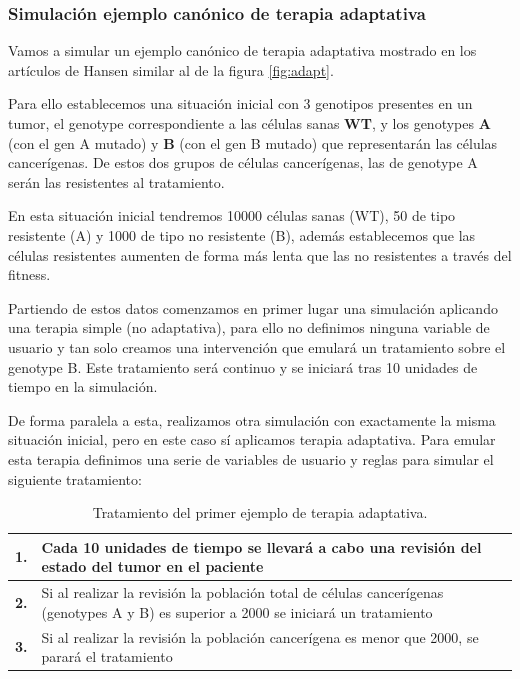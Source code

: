 \subsubsection{Simulación ejemplo canónico de terapia adaptativa}\label{5.3.2.1}

Vamos a simular un ejemplo canónico de terapia adaptativa mostrado en los artículos de Hansen\cite{Hansen1}\cite{Hansen2} similar al de la figura \ref{fig:adapt}.

Para ello establecemos una situación inicial con 3 genotipos presentes en un tumor, el \gls{genotype} correspondiente a las células sanas \textbf{WT}, y los \glspl{genotype} \textbf{A} (con el \gls{gen} A mutado) y \textbf{B} (con el \gls{gen} B mutado) que representarán las células cancerígenas. De estos dos grupos de células cancerígenas, las de \gls{genotype} A serán las resistentes al tratamiento.

En esta situación inicial tendremos 10000 células sanas (WT), 50 de tipo resistente (A) y 1000 de tipo no resistente (B), además establecemos que las células resistentes aumenten de forma más lenta que las no resistentes a través del fitness.

Partiendo de estos datos comenzamos en primer lugar una simulación aplicando una terapia simple (no adaptativa), para ello no definimos ninguna variable de usuario y tan solo creamos una intervención que emulará un tratamiento sobre el \gls{genotype} B. Este tratamiento será continuo y se iniciará tras 10 unidades de tiempo en la simulación.

De forma paralela a esta, realizamos otra simulación con exactamente la misma situación inicial, pero en este caso sí aplicamos terapia adaptativa. Para emular esta terapia definimos una serie de variables de usuario y reglas para simular el siguiente tratamiento:

\begin{table}[h]
	\footnotesize
	\begin{tabular}{|p{0.3cm}|p{15.2cm}|}
		\hline
		\textbf{1.} & Cada 10 unidades de tiempo se llevará a cabo una revisión del estado del tumor en el paciente \\ \hline
		\textbf{2.} & Si al realizar la revisión la población total de células cancerígenas (\glspl{genotype} A y B) es superior a 2000 se iniciará un tratamiento \\ \hline
		\textbf{3.} & Si al realizar la revisión la población cancerígena es menor que 2000, se parará el tratamiento \\ \hline
	\end{tabular}
	\caption{Tratamiento del primer ejemplo de terapia adaptativa.}
	\label{tab:ejemploATtreat}
\end{table}

